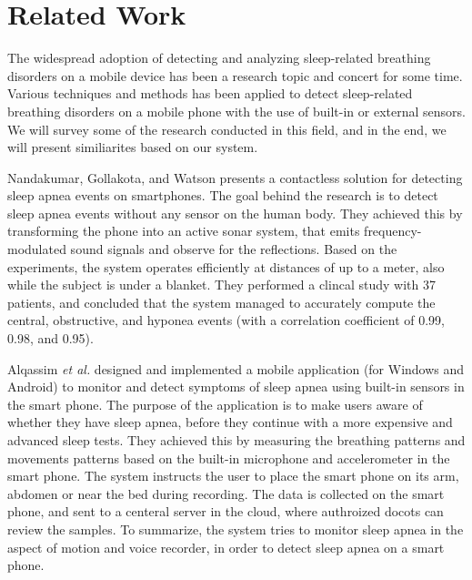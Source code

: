 \chapter{Related Work}
The widespread adoption of detecting and analyzing sleep-related breathing disorders on a mobile device has been a research topic and concert for some time. Various techniques and methods has been applied to detect sleep-related breathing disorders on a mobile phone with the use of built-in or external sensors. We will survey some of the research conducted in this field, and in the end, we will present similiarites based on our system. 

Nandakumar, Gollakota, and Watson \cite{contactless_sleep} presents a contactless solution for detecting sleep apnea events on smartphones. The goal behind the research is to detect sleep apnea events without any sensor on the human body. They achieved this by transforming the phone into an active sonar system, that emits frequency-modulated sound signals and observe for the reflections. Based on the experiments, the system operates efficiently at distances of up to a meter, also while the subject is under a blanket. They performed a clincal study with 37 patients, and concluded that the system managed to accurately compute the central, obstructive, and hyponea events (with a correlation coefficient of 0.99, 0.98, and 0.95). 

Alqassim \textit{et al.} \cite{sam} designed and implemented a mobile application (for Windows and Android) to monitor and detect symptoms of sleep apnea using built-in sensors in the smart phone. The purpose of the application is to make users aware of whether they have sleep apnea, before they continue with a more expensive and advanced sleep tests. They achieved this by measuring the breathing patterns and movements patterns based on the built-in microphone and accelerometer in the smart phone. The system instructs the user to place the smart phone on its arm, abdomen or near the bed during recording. The data is collected on the smart phone, and sent to a centeral server in the cloud, where authroized docots can review the samples. To summarize, the system tries to monitor sleep apnea in the aspect of motion and voice recorder, in order to detect sleep apnea on a smart phone. 

